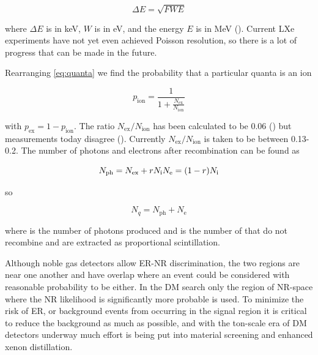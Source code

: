\begin{equation}
\Delta E = \sqrt{F W E}
\end{equation}

\noindent where $\Delta E$ is in keV, $W$ is in eV, and the energy $E$ is in MeV ().  Current LXe experiments have
not yet even achieved Poisson resolution, so there is a lot of progress that can be made in the future.

Rearranging \eqref{eq:quanta} we find the probability that a particular quanta is an ion

\begin{equation}
p_{\mathrm{ion}} = \frac{1}{1 + \frac{ N_{\mathrm{ex}} }{ N_{\mathrm{ion}} }}
\end{equation}

\noindent with $p_{\mathrm{ex}} = 1 - p_{\mathrm{ion}}$.  The ratio $N_{\mathrm{ex}} / N_{\mathrm{ion}}$ has been calculated to be
0.06 ()
but measurements today disagree ().  Currently $N_{\mathrm{ex}} / N_{\mathrm{ion}}$ is taken to be between
0.13-0.2.  The number of
photons and electrons after recombination can be found as

\begin{equation}
N_{\mathrm{ph}} = N_{\mathrm{ex}} + rN_{\mathrm{i}} \\
N_{\mathrm{e}} = (1 - r)N_{\mathrm{i}} \\
\end{equation}

so

\begin{equation}
N_{q} = N_{\mathrm{ph}} + N_{\mathrm{e}}
\label{eq:nphot_ne}
\end{equation}

\noindent where \nphot is the number of photons produced and \nelect is the number of \electron that do not recombine and are extracted as
proportional scintillation.

Although noble gas detectors allow ER-NR discrimination, the two regions are near one another and have overlap where an event could
be considered with reasonable probability to be either.  In the DM search only the region of NR-space where the NR likelihood is
significantly more probable is used.  To minimize the risk of ER, or background events from occurring in the signal region it is
critical to reduce the background as much as possible, and with the ton-scale era of DM detectors underway much effort is being put into
material screening and enhanced xenon distillation.


